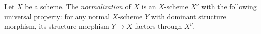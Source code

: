         


    \begin{definition}
        Let $X$ be a scheme.
        The \textit{normalization} of $X$ is an $X$-scheme $X^\nu$ with the following universal property:
        for any normal $X$-scheme $Y$ with dominant structure morphism, its structure morphism $Y \to X$ factors through $X^\nu$.
    \end{definition}

